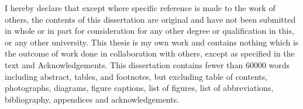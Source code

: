 
\begin{declaration}


    I hereby declare that except where specific reference is made to the work of others, the contents of this dissertation are original and have not been submitted in whole or in part for consideration for any other degree or qualification in this, or any other university. This thesis is my own work and contains nothing which is the outcome of work done in collaboration with others, except as specified in the text and Acknowledgements. This dissertation contains fewer than \num{60000} words including abstract, tables, and footnotes, but excluding table of contents, photographs, diagrams, figure captions, list of figures, list of abbreviations, bibliography, appendices and acknowledgements.
    

\end{declaration}

